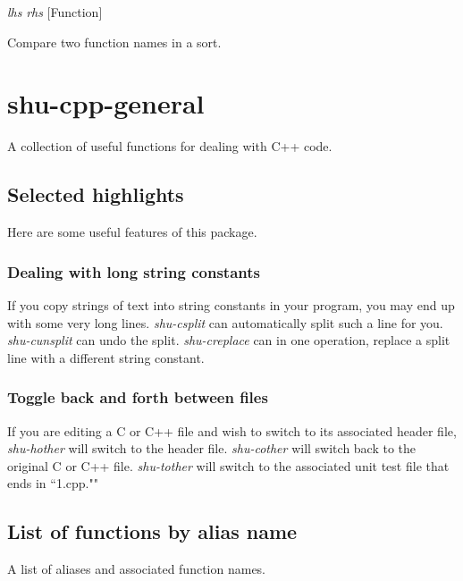 \vspace{1em}
\noindent
{}
\usebox{\funcname}\emph{lhs} \emph{rhs}
 \hfill [Function]

\begin{doc-string}
Compare two function names in a sort.
\end{doc-string}

\eject
\section{shu-cpp-general}


A collection of useful functions for dealing with C++ code.

\subsection{Selected highlights}

Here are some useful features of this package.

\subsubsection{Dealing with long string constants}

If you copy strings of text into string constants in your program, you may end up
with some very long lines.  \emph{shu-csplit} can automatically split such a line
for you.  \emph{shu-cunsplit} can undo the split.  \emph{shu-creplace} can in one
operation, replace a split line with a different string constant.

\subsubsection{Toggle back and forth between files}

If you are editing a C or C++ file and wish to switch to its associated
header file, \emph{shu-hother} will switch to the header file.  \emph{shu-cother} will
switch back to the original C or C++ file.  \emph{shu-tother} will switch to the
associated unit test file that ends in ``1.cpp.""


\subsection{List of functions by alias name}

A list of aliases and associated function names.



